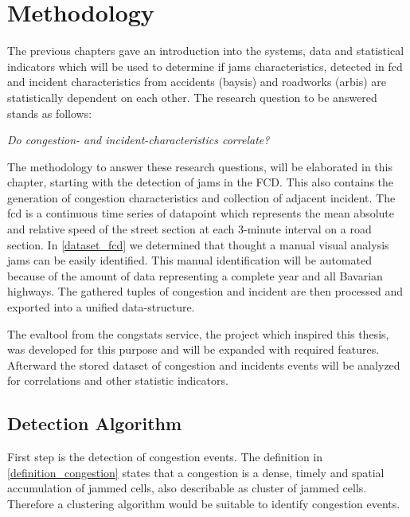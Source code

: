 \documentclass[a4paper,headsepline,footsepline,fontsize=11pt,BCOR=12mm,DIV=12]{report}
\begin{document}
\chapter{Methodology}
\label{methodology}
The previous chapters gave an introduction into the systems, data and statistical indicators which will be used to determine if jams characteristics, detected in \acrshort{fcd} and incident characteristics from accidents (\acrshort{baysis}) and roadworks (\acrshort{arbis}) are statistically dependent on each other. The research question to be answered stands as follows:

\begin{center}
	\textit{Do congestion- and incident-characteristics correlate?}
\end{center}

\medskip

The methodology to answer these research questions, will be elaborated in this chapter, starting with the detection of jams in the FCD. This also contains the generation of congestion characteristics and collection of adjacent incident. The \acrshort{fcd} is a continuous time series of datapoint which represents the mean absolute and relative speed of the street section at each 3-minute interval on a road section. In \ref{dataset_fcd} we determined that thought a manual visual analysis jams can be easily identified. This manual identification will be automated because of the amount of data representing a complete year and all Bavarian highways. The gathered tuples of congestion and incident are then processed and exported into a unified data-structure. 

The \gls{evaltool} from the \gls{congstats} service, the project which inspired this thesis, was developed for this purpose and will be expanded with required features. Afterward the stored dataset of congestion and incidents events will be analyzed for correlations and other statistic indicators.

\bigskip

\section{Detection Algorithm}
First step is the detection of congestion events. The definition in \ref{definition_congestion} states that a congestion is a dense, timely and spatial accumulation of jammed cells, also describable as cluster of jammed cells. Therefore a clustering algorithm would be suitable to identify congestion events.
\end{document}
